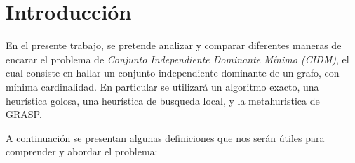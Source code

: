 \documentclass[a4paper]{article}
\begin{document}

\thispagestyle{empty}

\maketitle
\newpage

\thispagestyle{empty}
\vfill
%	
%

\thispagestyle{empty}
\vspace{1.5cm}
\tableofcontents
\newpage

 
\newpage
\section{Introducción}
\vspace*{0.3cm}
En el presente trabajo, se pretende analizar y comparar diferentes maneras de encarar el problema de {\it Conjunto Independiente Dominante Mínimo (CIDM)}, el cual consiste en hallar un conjunto independiente dominante de un grafo, con mínima cardinalidad. En particular se utilizará un algoritmo exacto, una heurística golosa, una heurística de busqueda local, y la metahuristica de GRASP.

A continuación se presentan algunas definiciones que nos serán útiles para comprender y abordar el problema:
\end{document}
